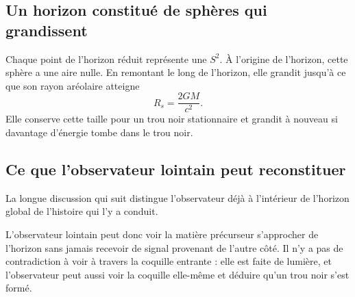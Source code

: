\subsection{Un horizon constitué de sphères qui grandissent}

Chaque point de l’horizon réduit représente une \(S^2\). À l’origine de l’horizon, cette sphère a une aire nulle. En remontant le long de l’horizon, elle grandit jusqu’à ce que son rayon aréolaire atteigne
\begin{equation}
R_s=\frac{2GM}{c^2}.
\end{equation}
Elle conserve cette taille pour un trou noir stationnaire et grandit à nouveau si davantage d’énergie tombe dans le trou noir.


\subsection{Ce que l’observateur lointain peut reconstituer}

La longue discussion qui suit distingue l’observateur déjà à l’intérieur de l’horizon global de l’histoire qui l’y a conduit.

\begin{classroomqa}
\end{classroomqa}

L’observateur lointain peut donc voir la matière précurseur s’approcher de l’horizon sans jamais recevoir de signal provenant de l’autre côté. Il n’y a pas de contradiction à voir à travers la coquille entrante : elle est faite de lumière, et l’observateur peut aussi voir la coquille elle-même et déduire qu’un trou noir s’est formé.

